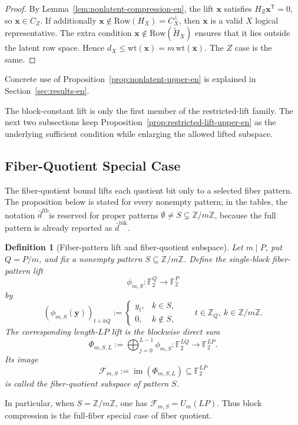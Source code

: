 \documentclass[11pt]{article}
\newcommand{\Ftwo}{\mathbb{F}_2}
\newcommand{\Z}{\mathbb{Z}}
\newcommand{\Row}{\mathrm{Row}}
\newcommand{\wt}{\mathrm{wt}}
\newcommand{\Htil}{\tilde{H}}
\newcommand{\dbound}[1]{\ensuremath{\bar{d}^{\mathrm{#1}}}}
\newcommand{\dblk}{\dbound{blk}}
\newcommand{\dfib}{\dbound{fib}}
\newcommand{\markededit}[1]{#1}
\newcommand{\vect}[1]{\bm{#1}}
\newcommand{\vx}{\vect{x}}
\newcommand{\vy}{\vect{y}}
\theoremstyle{uprightthm}
\newtheorem{definition}[theorem]{Definition}
\begin{document}
\begin{proof}
By Lemma~\ref{lem:nonlatent-compression-en}, the lift $\vx$ satisfies $H_Z\vx^{\mathsf T}=0$, so $\vx\in C_Z$. If additionally $\vx\notin \Row(H_X)=C_X^\perp$, then $\vx$ is a valid $X$ logical representative. The extra condition $\vx\notin \Row(\Htil_X)$ ensures that it lies outside the latent row space. Hence $d_X\le \wt(\vx)=m\,\wt(\bar{\vx})$. The $Z$ case is the same.
\end{proof}

Concrete use of Proposition~\ref{prop:nonlatent-upper-en} is explained in
Section~\ref{sec:results-en}.

The block-constant lift is only the first member of the restricted-lift
family.  The next two subsections keep
Proposition~\ref{prop:restricted-lift-upper-en} as the underlying \markededit{sufficient condition}
while enlarging the allowed lifted subspace.

\subsection{Fiber-Quotient Special Case}
\label{sec:fiber-quotient-en}
The fiber-quotient bound lifts each quotient bit only to a selected fiber
pattern.  \markededit{The proposition below is stated for every nonempty pattern; in the
tables, the notation \dfib is reserved for proper patterns
\(\emptyset\neq S\subsetneq\Z/m\Z\), because the full pattern is already
reported as \dblk.}

\begin{definition}[Fiber-pattern lift and fiber-quotient subspace]
\label{def:fiber-quotient-subspace-en}
Let $m\mid P$, put $Q=P/m$, and fix a nonempty pattern
$S\subseteq \Z/m\Z$.  Define the single-block fiber-pattern lift
\[
\phi_{m,S}:\Ftwo^Q\longrightarrow \Ftwo^P
\]
by
\[
(\phi_{m,S}(\vy))_{t+kQ}
:=
\begin{cases}
y_t, & k\in S,\\
0, & k\notin S,
\end{cases}
\qquad
t\in\Z_Q,\ k\in\Z/m\Z .
\]
The corresponding length-$LP$ lift is the blockwise direct sum
\[
\Phi_{m,S,L}:=\bigoplus_{j=0}^{L-1}\phi_{m,S}:
\Ftwo^{LQ}\longrightarrow\Ftwo^{LP}.
\]
Its image
\[
\mathcal F_{m,S}:=\operatorname{im}(\Phi_{m,S,L})
\subseteq \Ftwo^{LP}
\]
is called the fiber-quotient subspace of pattern $S$.
\end{definition}

In particular, when $S=\Z/m\Z$, one has $\mathcal F_{m,S}=U_m(LP)$.
Thus block compression is the full-fiber special case of fiber quotient.
\end{document}

